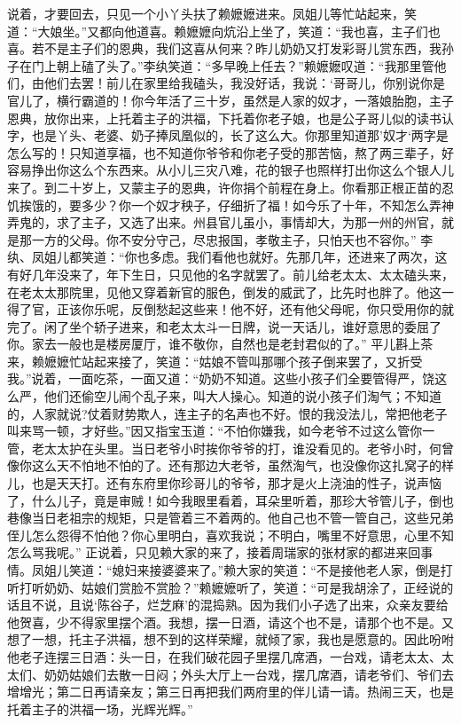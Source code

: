 \documentclass[12pt,oneside]{book}
\begin{document}
说着，才要回去，只见一个小丫头扶了赖嬷嬷进来。凤姐儿等忙站起来，笑道：“大娘坐。”又都向他道喜。赖嬷嬷向炕沿上坐了，笑道：“我也喜，主子们也喜。若不是主子们的恩典，我们这喜从何来？昨儿奶奶又打发彩哥儿赏东西，我孙子在门上朝上磕了头了。”李纨笑道：“多早晚上任去？”赖嬷嬷叹道：“我那里管他们，由他们去罢！前儿在家里给我磕头，我没好话，我说：‘哥哥儿，你别说你是官儿了，横行霸道的！你今年活了三十岁，虽然是人家的奴才，一落娘胎胞，主子恩典，放你出来，上托着主子的洪福，下托着你老子娘，也是公子哥儿似的读书认字，也是丫头、老婆、奶子捧凤凰似的，长了这么大。你那里知道那’奴才‘两字是怎么写的！只知道享福，也不知道你爷爷和你老子受的那苦恼，熬了两三辈子，好容易挣出你这么个东西来。从小儿三灾八难，花的银子也照样打出你这么个银人儿来了。到二十岁上，又蒙主子的恩典，许你捐个前程在身上。你看那正根正苗的忍饥挨饿的，要多少？你一个奴才秧子，仔细折了福！如今乐了十年，不知怎么弄神弄鬼的，求了主子，又选了出来。州县官儿虽小，事情却大，为那一州的州官，就是那一方的父母。你不安分守己，尽忠报国，孝敬主子，只怕天也不容你。”
李纨、凤姐儿都笑道：“你也多虑。我们看他也就好。先那几年，还进来了两次，这有好几年没来了，年下生日，只见他的名字就罢了。前儿给老太太、太太磕头来，在老太太那院里，见他又穿着新官的服色，倒发的威武了，比先时也胖了。他这一得了官，正该你乐呢，反倒愁起这些来！他不好，还有他父母呢，你只受用你的就完了。闲了坐个轿子进来，和老太太斗一日牌，说一天话儿，谁好意思的委屈了你。家去一般也是楼房厦厅，谁不敬你，自然也是老封君似的了。”
平儿斟上茶来，赖嬷嬷忙站起来接了，笑道：“姑娘不管叫那哪个孩子倒来罢了，又折受我。”说着，一面吃茶，一面又道：“奶奶不知道。这些小孩子们全要管得严，饶这么严，他们还偷空儿闹个乱子来，叫大人操心。知道的说小孩子们淘气；不知道的，人家就说?仗着财势欺人，连主子的名声也不好。恨的我没法儿，常把他老子叫来骂一顿，才好些。”因又指宝玉道：“不怕你嫌我，如今老爷不过这么管你一管，老太太护在头里。当日老爷小时挨你爷爷的打，谁没看见的。老爷小时，何曾像你这么天不怕地不怕的了。还有那边大老爷，虽然淘气，也没像你这扎窝子的样儿，也是天天打。还有东府里你珍哥儿的爷爷，那才是火上浇油的性子，说声恼了，什么儿子，竟是审贼！如今我眼里看着，耳朵里听着，那珍大爷管儿子，倒也巷像当日老祖宗的规矩，只是管着三不着两的。他自己也不管一管自己，这些兄弟侄儿怎么怨得不怕他？你心里明白，喜欢我说；不明白，嘴里不好意思，心里不知怎么骂我呢。”
正说着，只见赖大家的来了，接着周瑞家的张材家的都进来回事情。凤姐儿笑道：“媳妇来接婆婆来了。”赖大家的笑道：“不是接他老人家，倒是打听打听奶奶、姑娘们赏脸不赏脸？”赖嬷嬷听了，笑道：“可是我胡涂了，正经说的话且不说，且说‘陈谷子，烂芝麻’的混捣熟。因为我们小子选了出来，众亲友要给他贺喜，少不得家里摆个酒。我想，摆一日酒，请这个也不是，请那个也不是。又想了一想，托主子洪福，想不到的这样荣耀，就倾了家，我也是愿意的。因此吩咐他老子连摆三日酒：头一日，在我们破花园子里摆几席酒，一台戏，请老太太、太太们、奶奶姑娘们去散一日闷；外头大厅上一台戏，摆几席酒，请老爷们、爷们去增增光；第二日再请亲友；第三日再把我们两府里的伴儿请一请。热闹三天，也是托着主子的洪福一场，光辉光辉。”
\end{document}
